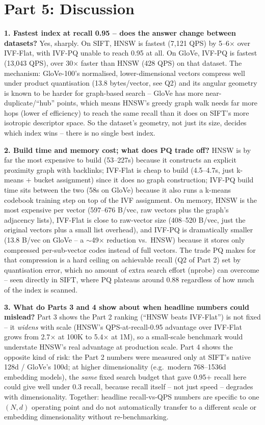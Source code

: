\documentclass[10pt]{article}
\begin{document}
\section*{Part 5: Discussion}
\textbf{1. Fastest index at recall 0.95 -- does the answer change between datasets?} Yes,
sharply. On SIFT, HNSW is fastest (7{,}121 QPS) by 5--6$\times$ over IVF-Flat, with IVF-PQ unable
to reach 0.95 at all. On GloVe, IVF-PQ is fastest (13{,}043 QPS), over 30$\times$ faster than
HNSW (428 QPS) on that dataset. The mechanism: GloVe-100's normalised, lower-dimensional vectors
compress well under product quantisation (13.8 bytes/vector, see Q2) and its angular geometry is
known to be harder for graph-based search -- GloVe has more near-duplicate/``hub'' points, which
means HNSW's greedy graph walk needs far more hops (lower ef efficiency) to reach the same recall
than it does on SIFT's more isotropic descriptor space. So the dataset's geometry, not just its
size, decides which index wins -- there is no single best index.

\textbf{2. Build time and memory cost; what does PQ trade off?} HNSW is by far the most
expensive to build (53--227s) because it constructs an explicit proximity graph with backlinks;
IVF-Flat is cheap to build (4.5--4.7s, just k-means + bucket assignment) since it does no graph
construction; IVF-PQ build time sits between the two (58s on GloVe) because it also runs a
k-means codebook training step on top of the IVF assignment. On memory, HNSW is the most
expensive per vector (597--676 B/vec, raw vectors plus the graph's adjacency lists), IVF-Flat
is close to raw-vector size (408--520 B/vec, just the original vectors plus a small list
overhead), and IVF-PQ is dramatically smaller (13.8 B/vec on GloVe -- a $\sim$49$\times$
reduction vs.\ HNSW) because it stores only compressed per-sub-vector codes instead of full
vectors. The trade PQ makes for that compression is a hard ceiling on achievable recall (Q2 of
Part 2) set by quantisation error, which no amount of extra search effort (nprobe) can overcome
-- seen directly in SIFT, where PQ plateaus around 0.88 regardless of how much of the index is
scanned.

\textbf{3. What do Parts 3 and 4 show about when headline numbers could mislead?} Part 3 shows
the Part 2 ranking (``HNSW beats IVF-Flat'') is not fixed -- it \emph{widens} with scale (HNSW's
QPS-at-recall-0.95 advantage over IVF-Flat grows from 2.7$\times$ at 100K to 5.4$\times$ at 1M), so
a small-scale benchmark would understate HNSW's real advantage at production scale. Part 4 shows
the opposite kind of risk: the Part 2 numbers were measured only at SIFT's native 128d / GloVe's
100d; at higher dimensionality (e.g.\ modern 768--1536d embedding models), the \emph{same} fixed
search budget that gave 0.95+ recall here could give well under 0.3 recall, because recall itself
-- not just speed -- degrades with dimensionality. Together: headline recall-vs-QPS numbers are
specific to one $(N, d)$ operating point and do not automatically transfer to a different scale or
embedding dimensionality without re-benchmarking.
\end{document}
